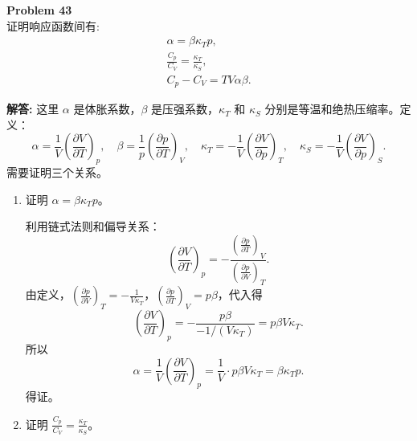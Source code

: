\documentclass[12pt, a4paper, oneside]{ctexart}
\newenvironment{solution}{\par\noindent\textbf{解答:}\quad}{\par}
\begin{document}
\begin{mdframed}[backgroundcolor=gray!10, linewidth=0pt]
    \textbf{Problem 43} \\
    证明响应函数间有:
    \[
    \begin{gathered}
        \alpha = \beta \kappa_T p, \\
        \frac{C_p}{C_V} = \frac{\kappa_T}{\kappa_S}, \\
        C_p - C_V = T V \alpha \beta.
    \end{gathered}
    \]
\end{mdframed}
\begin{solution}
    这里 $\alpha$ 是体胀系数，$\beta$ 是压强系数，$\kappa_T$ 和 $\kappa_S$ 分别是等温和绝热压缩率。定义：
    \[
    \alpha = \frac{1}{V} \left(\frac{\partial V}{\partial T}\right)_p, \quad
    \beta = \frac{1}{p} \left(\frac{\partial p}{\partial T}\right)_V, \quad
    \kappa_T = -\frac{1}{V} \left(\frac{\partial V}{\partial p}\right)_T, \quad
    \kappa_S = -\frac{1}{V} \left(\frac{\partial V}{\partial p}\right)_S.
    \]
    需要证明三个关系。
    \begin{enumerate}
        \item 证明 $\alpha = \beta \kappa_T p$。
        
        利用链式法则和偏导关系：
        \[
        \left(\frac{\partial V}{\partial T}\right)_p = -\frac{\left(\frac{\partial p}{\partial T}\right)_V}{\left(\frac{\partial p}{\partial V}\right)_T}.
        \]
        由定义，$\left(\frac{\partial p}{\partial V}\right)_T = -\frac{1}{V \kappa_T}$，$\left(\frac{\partial p}{\partial T}\right)_V = p \beta$，代入得
        \[
        \left(\frac{\partial V}{\partial T}\right)_p = -\frac{p \beta}{-1/(V \kappa_T)} = p \beta V \kappa_T.
        \]
        所以
        \[
        \alpha = \frac{1}{V} \left(\frac{\partial V}{\partial T}\right)_p = \frac{1}{V} \cdot p \beta V \kappa_T = \beta \kappa_T p.
        \]
        得证。

        \item 证明 $\frac{C_p}{C_V} = \frac{\kappa_T}{\kappa_S}$。
        

\end{enumerate}
\end{solution}
\end{document}

